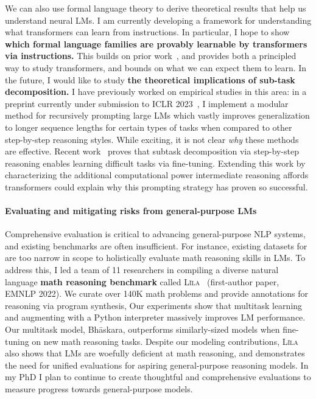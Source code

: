 \documentclass[11pt]{article}
\newcommand\lila{\textsc{L\={\i}la}\xspace}
\begin{document}
We can also use formal language theory to derive theoretical results 
that help us understand neural LMs. 
I am currently developing a framework for 
understanding what transformers can learn from instructions. 
In particular, I hope to show \textbf{which formal language families 
are provably learnable by transformers 
via instructions.}
This builds on prior work~\cite{Merrill2022LogPrecisionTA},
and provides both a principled way to study transformers,
and bounds on what we can expect them to learn.
In the future, I would like to study
\textbf{the theoretical implications of sub-task decomposition.}
I have previously worked on empirical studies in this area:
in a preprint currently under submission 
to ICLR 2023~\cite{Khot2022DecomposedPA},
I implement a modular method for recursively prompting large LMs 
which vastly improves generalization to longer sequence lengths 
for certain types of tasks 
when compared to other step-by-step reasoning styles.
While exciting, it is not clear \emph{why} these methods are effective.
Recent work~\cite{Wies2022SubTaskDE} 
proves that subtask decomposition
via step-by-step reasoning
enables learning difficult tasks via fine-tuning.
Extending this work
by characterizing the additional computational power 
intermediate reasoning affords transformers
could explain why this prompting strategy has proven so successful.

\paragraph{Evaluating and mitigating risks from general-purpose LMs}

Comprehensive evaluation is critical to advancing general-purpose NLP systems,
and existing benchmarks are often insufficient.
For instance, existing datasets for are too narrow in scope 
to holistically evaluate math reasoning skills in LMs.
To address this, I led a team of 11 researchers 
in compiling a diverse natural language 
\textbf{math reasoning benchmark} 
called \lila~\cite{Mishra2022LilaAU} (first-author paper, EMNLP 2022).
We curate over 140K math problems
and provide annotations for reasoning via program synthesis, 
Our experiments show that multitask learning 
and augmenting with a Python interpreter
massively improves LM performance. 
Our multitask model, Bh\=askara, 
outperforms similarly-sized models
when fine-tuning on new math reasoning tasks.
Despite our modeling contributions, \lila also shows that LMs 
are woefully deficient at math reasoning,
and demonstrates the need for unified evaluations for 
aspiring general-purpose reasoning models.
In my PhD I plan to continue to create thoughtful and comprehensive evaluations 
to measure progress towards general-purpose models.
\end{document}
